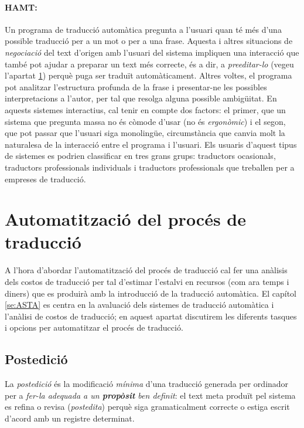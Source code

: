 \paragraph{HAMT:} Un programa de traducció automàtica pregunta a
l'usuari quan té més d'una possible traducció per a un mot o per a una
frase.  Aquesta i altres situacions de \emph{negociació} del text
d'origen amb l'usuari del sistema impliquen una interacció que també
pot ajudar a preparar un text més correcte, és a dir, a
\emph{preeditar-lo} (vegeu l'apartat \ref{ss:preedposted}) perquè puga
ser traduït automàticament. Altres voltes, el programa pot analitzar
l'estructura profunda de la frase i presentar-ne les possibles
interpretacions a l'autor, per tal que resolga alguna possible
ambigüitat. En aquests sistemes interactius, cal tenir en compte dos
factors: el primer, que un sistema que pregunta massa no és còmode
d'usar (no és \emph{ergonòmic}) i el segon, que pot passar que
l'usuari siga monolingüe, circumstància que canvia molt la naturalesa
de la interacció entre el programa i l'usuari.  Els usuaris d'aquest
tipus de sistemes es podrien classificar en tres grans grups:
traductors ocasionals, traductors professionals individuals i
traductors professionals que treballen per a empreses de traducció.

\section{Automatització del procés de traducció}
\label{ss:preedposted}
A l'hora d'abordar l'automatització del procés de traducció cal fer
una anàlisis dels costos de traducció per tal d'estimar l'estalvi en
recursos (com ara temps i diners) que es produirà amb la introducció
de la traducció automàtica. El capítol \ref{se:ASTA} es centra en la
avaluació dels sistemes de traducció automàtica i l'anàlisi de costos
de traducció; en aquest apartat discutirem les diferents tasques i
opcions per automatitzar el procés de traducció.

\subsection{Postedició}
\label{ss:postedicio}
La \emph{postedició} és la modificació \emph{mínima} d'una traducció
generada per ordinador per a \emph{fer-la adequada a un
  \textbf{propòsit} ben definit}: el text meta produït pel sistema es
refina o revisa ({\em postedita}) perquè siga gramaticalment correcte
o estiga escrit d'acord amb un registre determinat.

